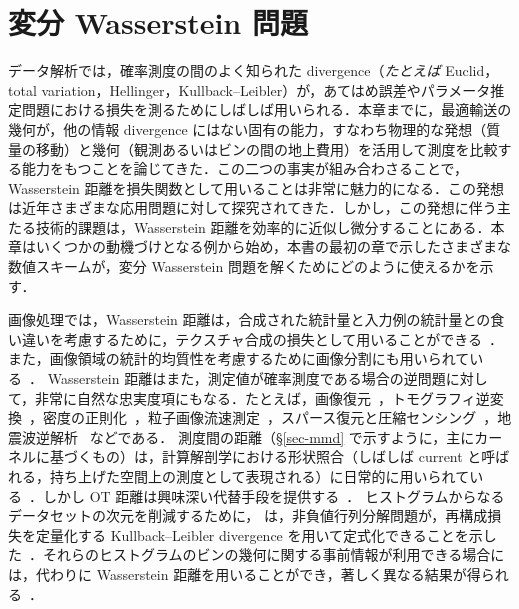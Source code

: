
\chapter{変分 Wasserstein 問題}
\label{c-variational} %

データ解析では，確率測度の間のよく知られた divergence（\emph{たとえば} Euclid，total variation，Hellinger，Kullback--Leibler）が，あてはめ誤差やパラメータ推定問題における損失を測るためにしばしば用いられる．本章までに，最適輸送の幾何が，他の情報 divergence にはない固有の能力，すなわち物理的な発想（質量の移動）と幾何（観測あるいはビンの間の地上費用）を活用して測度を比較する能力をもつことを論じてきた．この二つの事実が組み合わさることで，Wasserstein 距離を損失関数として用いることは非常に魅力的になる．この発想は近年さまざまな応用問題に対して探究されてきた．しかし，この発想に伴う主たる技術的課題は，Wasserstein 距離を効率的に近似し微分することにある．本章はいくつかの動機づけとなる例から始め，本書の最初の章で示したさまざまな数値スキームが，変分 Wasserstein 問題を解くためにどのように使えるかを示す．

画像処理では，Wasserstein 距離は，合成された統計量と入力例の統計量との食い違いを考慮するために，テクスチャ合成の損失として用いることができる~\citep{2016-tartavel-siims}．また，画像領域の統計的均質性を考慮するために画像分割にも用いられている~\citep{SchnorSegmentation,RabinPapadakisSSVM,peyre2012wasserstein,ni2009local,schmitzer2013object,liimage}．
%
Wasserstein 距離はまた，測定値が確率測度である場合の逆問題に対して，非常に自然な忠実度項にもなる．たとえば，画像復元~\citep{lellmann2014imaging}，トモグラフィ逆変換~\citep{AbrahamRadon}，密度の正則化~\citep{Burger-JKO}，粒子画像流速測定~\citep{saumier2015optimal}，スパース復元と圧縮センシング~\citep{indyk2011k}，地震波逆解析~\citep{metivier2016optimal} などである．
%
測度間の距離（\S\ref{sec-mmd} で示すように，主にカーネルに基づくもの）は，計算解剖学における形状照合（しばしば current と呼ばれる，持ち上げた空間上の測度として表現される）に日常的に用いられている~\citep{vaillant2005surface}．しかし OT 距離は興味深い代替手段を提供する~\citep{2017-feydy-miccai}．
%
ヒストグラムからなるデータセットの次元を削減するために，\citeauthor{lee1999learning} は，非負値行列分解問題が，再構成損失を定量化する Kullback--Leibler divergence を用いて定式化できることを示した~\citep{lee1999learning}．それらのヒストグラムのビンの幾何に関する事前情報が利用できる場合には，代わりに Wasserstein 距離を用いることができ，著しく異なる結果が得られる~\citep{Sandler09,ZenICPR14,pmlr-v51-rolet16}．

